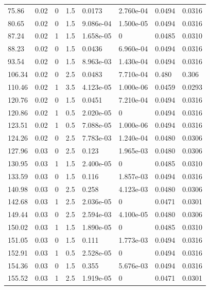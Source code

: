 \documentclass[preview]{standalone}
\begin{document}
{{\begin{tabular}{L{1.2cm}C{1.2cm} C{0.3cm}C{0.5cm} C{1.4cm}C{1.4cm} C{1.4cm}C{1.4cm}}
  75.86  &  0.02  & 0     & 1.5 &  0.0173  & 2.760e-04  & 0.0494 &  0.0316   \\ 
  80.65  &  0.02  & 0     & 1.5 &  9.086e-04  & 1.500e-05  & 0.0494 &  0.0316   \\ 
  87.24  &  0.02  & 1     & 1.5 &  1.658e-05  & 0  & 0.0485 &  0.0310   \\ 
  88.23  &  0.02  & 0     & 1.5 &  0.0436  & 6.960e-04  & 0.0494 &  0.0316   \\ 
  93.54  &  0.02  & 0     & 1.5 &  8.963e-03  & 1.430e-04  & 0.0494 &  0.0316   \\ 
  106.34  &  0.02  & 0     & 2.5 &  0.0483  & 7.710e-04  & 0.480 &  0.306   \\ 
  110.46  &  0.02  & 1     & 3.5 &  4.123e-05  & 1.000e-06  & 0.0459 &  0.0293   \\ 
  120.76  &  0.02  & 0     & 1.5 &  0.0451  & 7.210e-04  & 0.0494 &  0.0316   \\ 
  120.86  &  0.02  & 1     & 0.5 &  2.020e-05  & 0  & 0.0494 &  0.0316   \\ 
  123.51  &  0.02  & 1     & 0.5 &  7.088e-05  & 1.000e-06  & 0.0494 &  0.0316   \\ 
  124.26  &  0.02  & 0     & 2.5 &  7.783e-03  & 1.240e-04  & 0.0480 &  0.0306   \\ 
  127.96  &  0.03  & 0     & 2.5 &  0.123  & 1.965e-03  & 0.0480 &  0.0306   \\ 
  130.95  &  0.03  & 1     & 1.5 &  2.400e-05  & 0  & 0.0485 &  0.0310   \\ 
  133.59  &  0.03  & 0     & 1.5 &  0.116  & 1.857e-03  & 0.0494 &  0.0316   \\ 
  140.98  &  0.03  & 0     & 2.5 &  0.258  & 4.123e-03  & 0.0480 &  0.0306   \\ 
  142.68  &  0.03  & 1     & 2.5 &  2.036e-05  & 0  & 0.0471 &  0.0301   \\ 
  149.44  &  0.03  & 0     & 2.5 &  2.594e-03  & 4.100e-05  & 0.0480 &  0.0306   \\ 
  150.02  &  0.03  & 1     & 1.5 &  1.890e-05  & 0  & 0.0485 &  0.0310   \\ 
  151.05  &  0.03  & 0     & 1.5 &  0.111  & 1.773e-03  & 0.0494 &  0.0316   \\ 
  152.91  &  0.03  & 1     & 0.5 &  2.528e-05  & 0  & 0.0494 &  0.0316   \\ 
  154.36  &  0.03  & 0     & 1.5 &  0.355  & 5.676e-03  & 0.0494 &  0.0316   \\ 
  155.52  &  0.03  & 1     & 2.5 &  1.919e-05  & 0  & 0.0471 &  0.0301   \\ 

\end{tabular}}}
\end{document}
